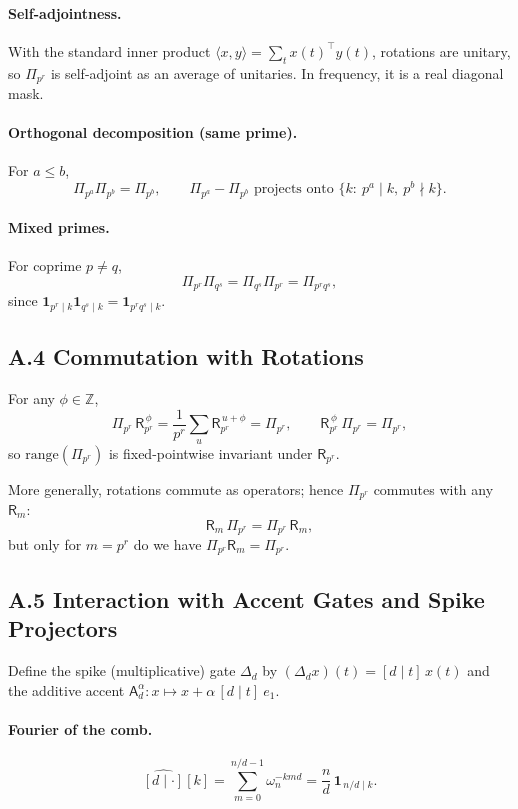 \documentclass[12pt]{article}
\numberwithin{equation}{section}
\theoremstyle{plain}
\theoremstyle{definition}
\theoremstyle{remark}
\begin{document}
\paragraph{Self-adjointness.} With the standard inner product $\langle x,y\rangle=\sum_t x(t)^\top y(t)$, rotations are unitary, so $\Pi_{p^r}$ is self-adjoint as an average of unitaries. In frequency, it is a real diagonal mask.

\paragraph{Orthogonal decomposition (same prime).} For $a\le b$,
\[
\Pi_{p^a}\Pi_{p^b}=\Pi_{p^b},\qquad \Pi_{p^a}-\Pi_{p^b} \text{ projects onto } \{k:\ p^a\mid k,\ p^b\nmid k\}.
\]

\paragraph{Mixed primes.} For coprime $p\neq q$,
\[
\Pi_{p^r}\Pi_{q^s}=\Pi_{q^s}\Pi_{p^r}=\Pi_{p^r q^s},
\]
since $\mathbf{1}_{p^r\mid k}\mathbf{1}_{q^s\mid k}=\mathbf{1}_{p^r q^s\mid k}$.

\subsection*{A.4 Commutation with Rotations}
For any $\phi\in\mathbb{Z}$,
\[
\Pi_{p^r}\,\mathsf{R}_{p^r}^{\,\phi}=\frac{1}{p^r}\sum_{u}\mathsf{R}_{p^r}^{\,u+\phi}=\Pi_{p^r},\qquad
\mathsf{R}_{p^r}^{\,\phi}\,\Pi_{p^r}=\Pi_{p^r},
\]
so $\mathrm{range}(\Pi_{p^r})$ is fixed-pointwise invariant under $\mathsf{R}_{p^r}$.

More generally, rotations commute as operators; hence $\Pi_{p^r}$ commutes with any $\mathsf{R}_m$:
\[
\mathsf{R}_m\,\Pi_{p^r}=\Pi_{p^r}\,\mathsf{R}_m,
\]
but only for $m=p^r$ do we have $\Pi_{p^r}\mathsf{R}_m=\Pi_{p^r}$.

\subsection*{A.5 Interaction with Accent Gates and Spike Projectors}
Define the spike (multiplicative) gate $\Delta_{d}$ by $(\Delta_{d}x)(t)=[d\mid t]\,x(t)$ and the additive accent $\mathsf{A}_{d}^{\alpha}: x\mapsto x+\alpha\,[d\mid t]\ e_1$.

\paragraph{Fourier of the comb.}
\[
\widehat{[d\mid \cdot]}[k]=\sum_{m=0}^{n/d-1}\omega_n^{-k md}=\frac{n}{d}\,\mathbf{1}_{\,n/d\mid k}.
\]
\end{document}
